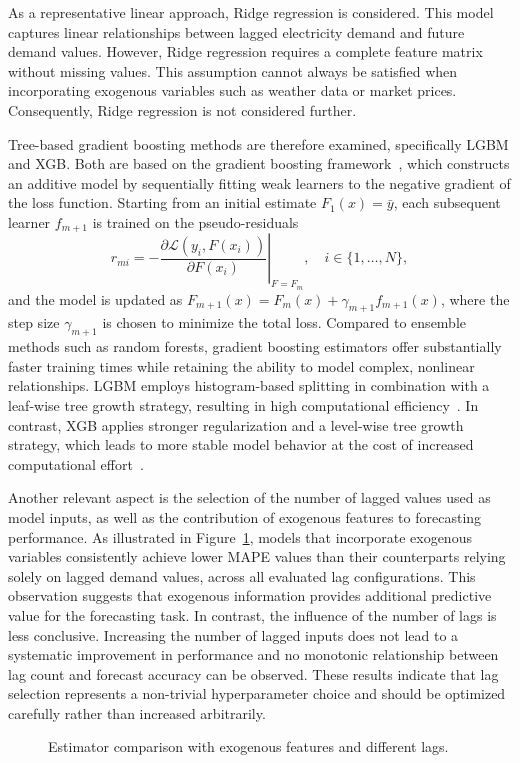 As a representative linear approach, Ridge regression is considered. This model captures linear relationships between lagged electricity demand and future demand values. However, Ridge regression requires a complete feature matrix without missing values. This assumption cannot always be satisfied when incorporating exogenous variables such as weather data or market prices. Consequently, Ridge regression is not considered further.

Tree-based gradient boosting methods are therefore examined, specifically \ac{LGBM} and \ac{XGB}. Both are based on the gradient boosting framework~\cite{hastie_2001_elements}, which constructs an additive model by sequentially fitting weak learners to the negative gradient of the loss function. Starting from an initial estimate $F_1(x) = \bar{y}$, each subsequent learner $f_{m+1}$ is trained on the pseudo-residuals
\begin{equation}
    \hat{r}_{mi} = -\left. \frac{\partial \mathcal{L}(y_i, F(x_i))}{\partial F(x_i)} \right|_{F = F_m}, \quad i \in \{1, \dots, N\},
\end{equation}
and the model is updated as $F_{m+1}(x) = F_m(x) + \gamma_{m+1} f_{m+1}(x)$, where the step size $\gamma_{m+1}$ is chosen to minimize the total loss. Compared to ensemble methods such as random forests, gradient boosting estimators offer substantially faster training times while retaining the ability to model complex, nonlinear relationships. \ac{LGBM} employs histogram-based splitting in combination with a leaf-wise tree growth strategy, resulting in high computational efficiency~\cite{shi_2025_lightgbm}. In contrast, \ac{XGB} applies stronger regularization and a level-wise tree growth strategy, which leads to more stable model behavior at the cost of increased computational effort~\cite{chen_2016_xgboost}.

Another relevant aspect is the selection of the number of lagged values used as model inputs, as well as the contribution of exogenous features to forecasting performance. As illustrated in Figure~\ref{fig:estimators}, models that incorporate exogenous variables consistently achieve lower \ac{MAPE} values than their counterparts relying solely on lagged demand values, across all evaluated lag configurations. This observation suggests that exogenous information provides additional predictive value for the forecasting task. In contrast, the influence of the number of lags is less conclusive. Increasing the number of lagged inputs does not lead to a systematic improvement in performance and no monotonic relationship between lag count and forecast accuracy can be observed. These results indicate that lag selection represents a non-trivial hyperparameter choice and should be optimized carefully rather than increased arbitrarily.
\begin{figure}[ht]
    \centering
    
    \caption{Estimator comparison with exogenous features and different lags.}
    \label{fig:estimators}
\end{figure}

